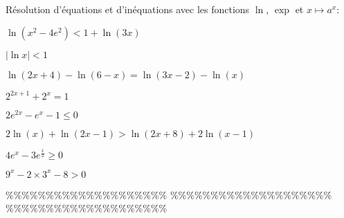 



\begin{exercice}\;
R\'esolution d'\'equations et d'in\'equations avec les fonctions $\ln{}$, $\exp{}$ et $x\mapsto a^x$:
\begin{enumerate}
\begin{minipage}[t]{0.45\textwidth}
\item  $\ln{(x^2-4e^2)}<1+\ln{(3x)}$
\item $|\ln{x}|<1$
\item  $\ln{(2x+4)} -\ln{(6-x)}=\ln{(3x-2)}-\ln{(x)}  $
\item $2^{2x+1}+2^x=1$
\end{minipage}
\begin{minipage}[t]{0.45\textwidth}
\item  $2e^{2x}-e^x-1\leq 0$
\item  $2\ln{(x)}+\ln{(2x-1)}>\ln{(2x+8)}+2\ln{(x-1)}$
\item  $4e^x-3e^{\frac{x}{2}}\geq 0$
\item $9^x-2\times 3^x-8>0$
\end{minipage}
\end{enumerate}
\end{exercice}


\%\%\%\%\%\%\%\%\%\%\%\%\%\%\%\%\%\%\%\%
\%\%\%\%\%\%\%\%\%\%\%\%\%\%\%\%\%\%\%\%
\%\%\%\%\%\%\%\%\%\%\%\%\%\%\%\%\%\%\%\%



